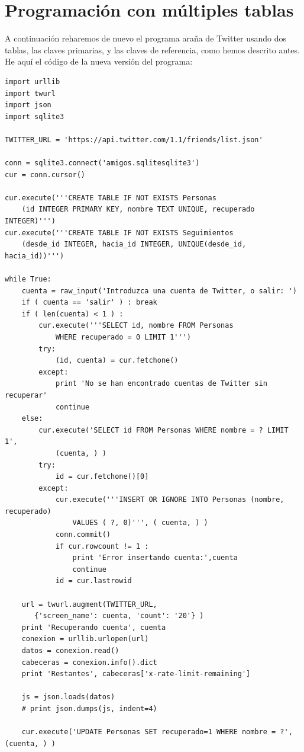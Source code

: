 \section{Programación con múltiples tablas}

A continuación reharemos de nuevo el programa araña de Twitter usando dos tablas, las claves
primarias, y las claves de referencia, como hemos descrito antes. He aquí el código
de la nueva versión del programa:

\beforeverb
\begin{verbatim}
import urllib
import twurl
import json
import sqlite3

TWITTER_URL = 'https://api.twitter.com/1.1/friends/list.json'

conn = sqlite3.connect('amigos.sqlitesqlite3')
cur = conn.cursor()

cur.execute('''CREATE TABLE IF NOT EXISTS Personas 
    (id INTEGER PRIMARY KEY, nombre TEXT UNIQUE, recuperado INTEGER)''')
cur.execute('''CREATE TABLE IF NOT EXISTS Seguimientos 
    (desde_id INTEGER, hacia_id INTEGER, UNIQUE(desde_id, hacia_id))''')

while True:
    cuenta = raw_input('Introduzca una cuenta de Twitter, o salir: ')
    if ( cuenta == 'salir' ) : break
    if ( len(cuenta) < 1 ) :
        cur.execute('''SELECT id, nombre FROM Personas
            WHERE recuperado = 0 LIMIT 1''')
        try:
            (id, cuenta) = cur.fetchone()
        except:
            print 'No se han encontrado cuentas de Twitter sin recuperar'
            continue
    else:
        cur.execute('SELECT id FROM Personas WHERE nombre = ? LIMIT 1', 
            (cuenta, ) )
        try:
            id = cur.fetchone()[0]
        except:
            cur.execute('''INSERT OR IGNORE INTO Personas (nombre, recuperado) 
                VALUES ( ?, 0)''', ( cuenta, ) )
            conn.commit()
            if cur.rowcount != 1 : 
                print 'Error insertando cuenta:',cuenta
                continue
            id = cur.lastrowid

    url = twurl.augment(TWITTER_URL, 
       {'screen_name': cuenta, 'count': '20'} )
    print 'Recuperando cuenta', cuenta
    conexion = urllib.urlopen(url)
    datos = conexion.read()
    cabeceras = conexion.info().dict
    print 'Restantes', cabeceras['x-rate-limit-remaining']

    js = json.loads(datos)
    # print json.dumps(js, indent=4)

    cur.execute('UPDATE Personas SET recuperado=1 WHERE nombre = ?', (cuenta, ) )


\end{verbatim}
